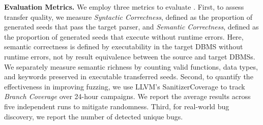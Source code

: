 \documentclass[conference]{IEEEtran}
\begin{document}
\textbf{Evaluation Metrics.}
We employ three metrics to evaluate \tool{}.
First, to assess transfer quality, we measure \textit{Syntactic Correctness}, defined as the proportion of generated seeds that pass the target parser, and \textit{Semantic Correctness}, defined as the proportion of generated seeds that execute without runtime errors.
Here, semantic correctness is defined by executability in the target DBMS without runtime errors, not by result equivalence between the source and target DBMSs.
We separately measure semantic richness by counting valid functions, data types, and keywords preserved in executable transferred seeds.
Second, to quantify the effectiveness in improving fuzzing, we use LLVM's SanitizerCoverage to track \textit{Branch Coverage} over 24-hour campaigns.
We report the average results across five independent runs to mitigate randomness.
Third, for real-world bug discovery, we report the number of detected unique bugs.
\end{document}
